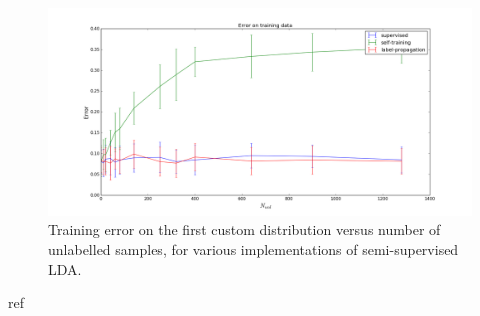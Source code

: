 \documentclass [a4paper] {report}
\begin{document}
	\begin{figure}[H]
		\begin{center}
			\includegraphics[scale=0.3]{Images/custom1_train_error.png}
			\caption{Training error on the first custom distribution versus number of unlabelled samples, for various implementations of semi-supervised LDA.}
			\label{custom_1}
		\end{center}
	\end{figure}
	
	 
	
	\begin{bibliography}{ref}
		
	\end{bibliography}
\end{document}
